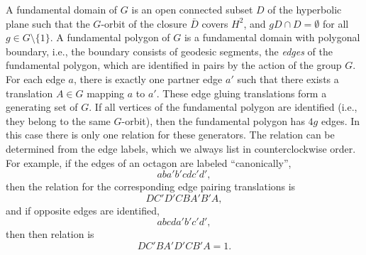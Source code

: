 \documentclass[Thesis]{subfiles}
\begin{document}
A fundamental domain of $G$ is an open connected subset $D$ of the
hyperbolic plane such that the $G$-orbit of the closure $\bar D$
covers $H^{2}$, and $gD\cap D=\emptyset$ for all $g\in
G\setminus\{1\}$.  A fundamental polygon of $G$ is a fundamental
domain with polygonal boundary, i.e., the boundary consists of
geodesic segments, the \emph{edges} of the fundamental polygon, which
are identified in pairs by the action of the group $G$. For each edge
$a$, there is exactly one partner edge $a'$ such that there exists a
translation $A\in G$ mapping $a$ to $a'$. These edge gluing
translations form a generating set of $G$. If all vertices of the
fundamental polygon are identified (i.e., they belong to the same
$G$-orbit), then the fundamental polygon has $4g$ edges. In this case
there is only one relation for these generators. The relation can be
determined from the edge labels, which we always list in
counterclockwise order. For example, if the edges of an octagon are
labeled ``canonically'',
\begin{equation}
\label{eq:canonical_polygon}
aba'b'cdc'd',
\end{equation}
then the relation for the corresponding edge pairing
translations is 
\begin{equation}
  \label{eq:canonical_relation_g2}
  DC'D'CBA'B'A, 
\end{equation}
and if opposite edges are identified,
\begin{equation}
  \label{eq:opposite_polygon_g2}
  abcda'b'c'd', 
\end{equation}
then then relation is 
\begin{equation}
\label{eq:opposite_relation_g2}
DC'BA'D'CB'A=1.
\end{equation}

\end{document}
